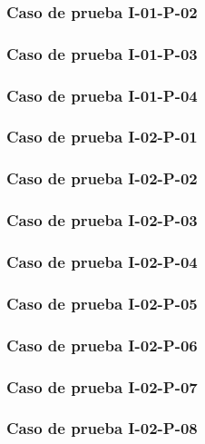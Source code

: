 \documentclass[10pt,a4paper]{article}
\begin{document}
			\subsubsection{Caso de prueba I-01-P-02}

			\subsubsection{Caso de prueba I-01-P-03}

			\subsubsection{Caso de prueba I-01-P-04}

			\subsubsection{Caso de prueba I-02-P-01}

			\subsubsection{Caso de prueba I-02-P-02}

			\subsubsection{Caso de prueba I-02-P-03}

			\subsubsection{Caso de prueba I-02-P-04}

			\subsubsection{Caso de prueba I-02-P-05}

			\subsubsection{Caso de prueba I-02-P-06}

			\subsubsection{Caso de prueba I-02-P-07}

			\subsubsection{Caso de prueba I-02-P-08}
\end{document}
